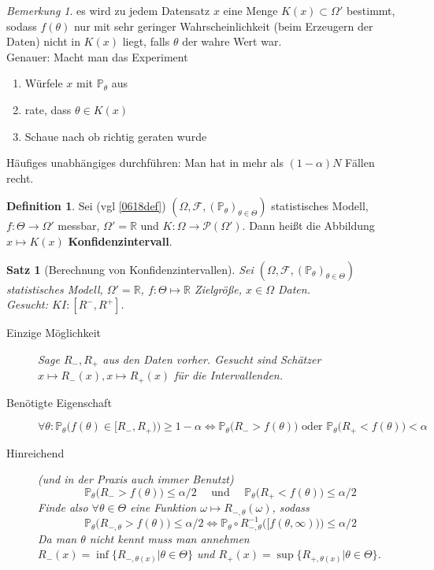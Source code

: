 \documentclass[10pt,a4paper]{article}
\newcommand{\R}{\ensuremath{\mathbb{R}}}
\newcommand{\al}{\ensuremath{\alpha}}
\newcommand{\Potset}{\mathscr P}
\newcommand{\Prb}{\mathbb P}
\newcommand{\scF}{\ensuremath{\mathscr{F}}}
\theoremstyle{plain}
\newtheorem{satz}[theorem]{Satz}
\theoremstyle{definition}
\newtheorem{definition}[theorem]{Definition}
\theoremstyle{remark}
\newtheorem{bem}[theorem]{Bemerkung}
\begin{document}
	\begin{bem}
		es wird zu jedem Datensatz $x$ eine Menge $K(x)\subset\Omega'$ bestimmt, sodass $f(\theta)$ nur mit sehr geringer Wahrscheinlichkeit (beim Erzeugern der Daten) nicht in $K(x)$ liegt, falls $\theta$ der wahre Wert war.\\
		Genauer: Macht man das Experiment
		\begin{enumerate}
			\item Würfele $x$ mit $\Prb_\theta$ aus
			\item rate, dass $\theta\in K(x)$
			\item Schaue nach ob richtig geraten wurde
		\end{enumerate}
	Häufiges unabhängiges durchführen: Man hat in mehr als $(1-\al)N$ Fällen recht.
	\end{bem}

	\begin{definition}
		Sei (vgl \ref{0618def}) $(\Omega,\scF,(\Prb_\theta)_{\theta\in\Theta})$ statistisches Modell, $f:\Theta\to\Omega'$ messbar, $\Omega'=\R$ und $K:\Omega\to\Potset(\Omega')$. Dann heißt die Abbildung $x\mapsto K(x)$ \textbf{Konfidenzintervall}.
	\end{definition}

	\begin{satz}[Berechnung von Konfidenzintervallen]
		Sei $(\Omega,\scF,(\Prb_\theta)_{\theta\in\Theta})$ statistisches Modell, $\Omega'=\R$, $f:\Theta\mapsto\R$ Zielgröße, $x\in\Omega$ Daten.\\
		Gesucht: $KI:[R^-,R^+]$.
		\begin{description}
			\item[Einzige Möglichkeit] Sage $R_-,R_+$ aus den Daten vorher. Gesucht sind Schätzer $x\mapsto R_-(x),x\mapsto R_+(x)$ für die Intervallenden.
			\item[Benötigte Eigenschaft]
			\[\forall\theta:\Prb_\theta\big(f(\theta)\in[R_-,R_+)\big)\geq 1-\al\Leftrightarrow\Prb_\theta\big(R_->f(\theta)\big)\text{ oder }\Prb_\theta\big(R_+<f(\theta)\big)<\al\]
			\item[Hinreichend] (und in der Praxis auch immer Benutzt)
			\[\Prb_\theta\big(R_->f(\theta)\big)\leq\al/2\quad\text{ und }\quad \Prb_\theta\big(R_+<f(\theta)\big)\leq\al/2\]
			Finde also $\forall\theta\in\Theta$  eine Funktion $\omega\mapsto R_{-,\theta}(\omega)$, sodass 
			\[\Prb_\theta\big(R_{-,\theta}>f(\theta)\big)\leq \al/2\Leftrightarrow\Prb_\theta\circ R^{-1}_{-,\theta}\big([f(\theta,\infty))\big)\leq \al/2\]
			Da man $\theta$ nicht kennt muss man annehmen $R_-(x)=\inf\{R_{-,\theta(x)}|\theta\in\Theta\}$ und $R_+(x)=\sup\{R_{+,\theta(x)}|\theta\in\Theta\}$.
		\end{description}
	\end{satz}
\end{document}
